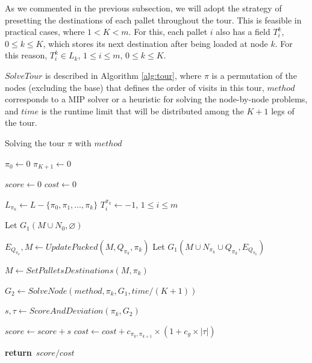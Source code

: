 \documentclass[preprint]{elsarticle}
\renewcommand{\Return}{\State \textbf{return}~}
\begin{document}
As we commented in the previous subsection, we will adopt the strategy of presetting the destinations of each pallet throughout the tour. This is feasible in practical cases, where $1<K<m$. For this, each pallet $i$\/ also has a field $T^k_i$, $0\leq k \leq K$, which stores its next destination after being loaded at node $k$. For this reason, $T^k_i \in L_k$, $1 \leq i \leq m$, $0\leq k \leq K$.


$SolveTour$\/ is described in Algorithm \ref{alg:tour}, where $\pi$\/ is a permutation of the nodes (excluding the base) that defines the order of visits in this tour, $method$\/ corresponds to a MIP solver or a heuristic for solving the node-by-node problems, and $time$\/ is the runtime limit that will be distributed among the $K+1$\/ legs of the tour.


\begin{algorithm}[H]
	\caption{Solving the tour $\pi$ with $method$}  \label{alg:tour}
	\begin{algorithmic}[1]
		
		
		\State $\pi_0     \gets 0$ \label{tour:pi1} 
		\State $\pi_{K+1} \gets 0$ \label{tour:pi2} 
		
		\State $score \gets 0$ \label{tour:score}
		\State $cost  \gets 0$ \label{tour:cost}
		
		 \label{tour:loop1}	
		\State $L_{\pi_k} \gets L - \{\pi_0,\pi_1,\ldots,\pi_k\}$  \label{tour:lk1}		
		\State $T_i^{\pi_k} \gets -1$, $1 \leq i \leq m$ \label{tour:-1} 

		\State Let $G_1(M \cup N_0, \varnothing)$ \label{tour:g11}
		\Else
	
		\State $E_{Q_{\pi_k}}, M \gets UpdatePacked(M, Q_{\pi_k}, \pi_k)$ \label{tour:dest}			
		\State Let $G_1(M \cup N_{\pi_k} \cup Q_{\pi_k}, E_{Q_{\pi_k}})$ \label{tour:g12}
		\EndIf  \label{tour:lk2}	
		
		\State $M \gets SetPalletsDestinations(M, \pi_k )$ \label{tour:dest2}
		
		\State $G_2 \gets SolveNode(method, \pi_k, G_1, time/(K+1))$  \label{tour:node}
		
		\State $s, \tau \gets ScoreAndDeviation(\pi_k, G_2)$ \label{tour:analyse}
		
		\State $score \gets score + s$ \label{tour:score2}
		\State $cost  \gets cost  + c_{\pi_k,\pi_{k+1}} \times (1 + c_g \times |\tau|)$ \label{tour:cost2} 
		
		\EndFor  \label{tour:loop2}
		
		\Return $score / cost$ \label{tour:f}
		
		\EndProcedure
		
	\end{algorithmic}
\end{algorithm}
\end{document}
